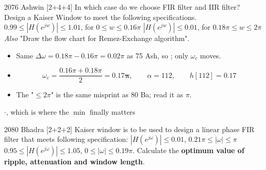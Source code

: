 \begin{asked}{2076 Ashwin \textperiodcentered{} [2+4+4]}
In which case do we choose FIR filter and IIR filter? Design a Kaiser Window to meet the
following specifications.\newline
$0.99\le|H(e^{jw})|\le1.01$, \quad for $0\le w\le0.16\pi$\newline
$|H(e^{jw})|\le0.01$, \quad for $0.18\pi\le w\le2\pi$\\
\textit{Also} "Draw the flow chart for Remez-Exchange algorithm".
\end{asked}

\begin{itemize}
  \item Same $\Delta\omega=0.18\pi-0.16\pi=0.02\pi$ as 75 Ash, so ;
        only $\omega_c$ moves.
  \item[] \[ \omega_c=\frac{0.16\pi+0.18\pi}{2}=\mathbf{0.17\pi},\qquad
             \alpha=112,\qquad h[112]=0.17 \]
  \item The "$\le2\pi$" is the same misprint as 80 Ba; read it as $\pi$.
\end{itemize}

{\color{sub}\footnotesize {} \gap$\cdot$\gap {}, which is where the $\min$ finally matters}

\begin{asked}{2080 Bhadra \textperiodcentered{} [2+2+2]}
Kaiser window is to be used to design a linear phase FIR filter that meets following
specification:\newline
$|H(e^{j\omega})|\le0.01$, \quad $0.21\pi\le|\omega|\le\pi$\newline
$0.95\le|H(e^{j\omega})|\le1.05$, \quad $0\le|\omega|\le0.19\pi$.\newline
Calculate the \textbf{optimum value of ripple, attenuation and window length}.
\end{asked}

